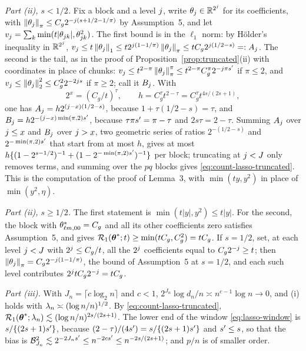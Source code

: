 \emph{Part (ii), $s < 1/2$.} Fix a block and a level $j$, write
$\theta_{j} \in \mathbb{R}^{2^{j}}$ for its coefficients, with
$\left\lVert \theta_{j} \right\rVert_{\pi} \le C_g2^{-j(s+1/2-1/\pi)}$ by Assumption~5,
and let $v_{j} = \sum_{k}\min(t|\theta_{jk}|,\theta_{jk}^{2})$.
The first bound is in the $\ell_1$ norm: by H\"older's inequality in
$\mathbb{R}^{2^{j}}$, $v_{j} \le t\left\lVert \theta_{j} \right\rVert_{1} \le
t2^{j(1-1/\pi)}\left\lVert \theta_{j} \right\rVert_{\pi} \le tC_g2^{j(1/2-s)} =:
A_{j}$. The second is the tail, as in the proof of
Proposition~\ref{prop:truncated}(ii) with coordinates in place of chunks:
$v_{j} \le t^{2-\pi}\left\lVert \theta_{j} \right\rVert_{\pi}^{\pi} \le
t^{2-\pi}C_g^{\pi}2^{-j\pi s'}$ if $\pi \le 2$, and
$v_{j} \le \left\lVert \theta_{j} \right\rVert_{2}^{2} \le C_g^{2}2^{-2j s}$ if
$\pi \ge 2$; call it $B_{j}$. With
\[
  2^{x} = (C_g/t)^{\tau},
  \qquad
  h = C_g^{\tau}t^{2-\tau} = C_g^{\tau}t^{4s/(2s+1)},
\]
one has $A_{j} = h2^{(j-x)(1/2-s)}$, because $1 + \tau(1/2-s) = \tau$,
and $B_{j} = h2^{-(j-x)\min(\pi,2)s'}$, because
$\tau\pi s' = \pi-\tau$ and $2s\tau = 2-\tau$. Summing $A_{j}$ over
$j \le x$ and $B_{j}$ over $j > x$, two geometric series of ratios
$2^{-(1/2-s)}$ and $2^{-\min(\pi,2)s'}$ that start from at most $h$, gives
at most $h\{(1-2^{s-1/2})^{-1} + (1-2^{-\min(\pi,2)s'})^{-1}\}$ per block;
truncating at $j < J$ only removes terms, and summing over the $pq$
blocks gives \eqref{eq:count-lasso-truncated}. This is the computation of
the proof of Lemma~3, with $\min(ty,y^{2})$ in place of $\min(y^{2},\eta)$.

\emph{Part (ii), $s \ge 1/2$.} The first statement is
$\min(t|y|,y^{2}) \le t|y|$. For the second, the block with
$\theta^{*}_{\ell m,00} = C_g$ and all its other coefficients zero satisfies
Assumption~5, and gives $\mathcal{R}_{1}(\boldsymbol{\theta}^{*};t) \ge \min(tC_g,C_g^{2}) = tC_g$.
If $s = 1/2$, set, at each level $j < J$ with $2^{j} \le C_g/t$, all
the $2^{j}$ coefficients equal to $C_g2^{-j} \ge t$; then
$\left\lVert \theta_{j} \right\rVert_{\pi} = C_g2^{-j(1-1/\pi)}$, the bound of
Assumption~5 at $s = 1/2$, and each such level contributes
$2^{j}tC_g2^{-j} = tC_g$.

\emph{Part (iii).} With $J_n = \lceil c\log_2 n\rceil$ and $c < 1$,
$2^{J_n}\log d_n/n \asymp n^{c-1}\log n \to 0$, and (i) holds with
$\lambda_{n} \asymp (\log n/n)^{1/2}$. By \eqref{eq:count-lasso-truncated},
$\mathcal{R}_{1}(\boldsymbol{\theta}^{*};\lambda_{n}) \lesssim (\log n/n)^{2s/(2s+1)}$. The lower end of
the window \eqref{eq:lasso-window} is $s/\{(2s+1)s'\}$, because
$(2-\tau)/(4s') = s/\{(2s+1)s'\}$ and $s' \le s$, so that the bias
is $\mathcal{B}_{J_n}^{2} \lesssim 2^{-2J_ns'} \le n^{-2cs'} \le
n^{-2s/(2s+1)}$; and $p/n$ is of smaller order.

